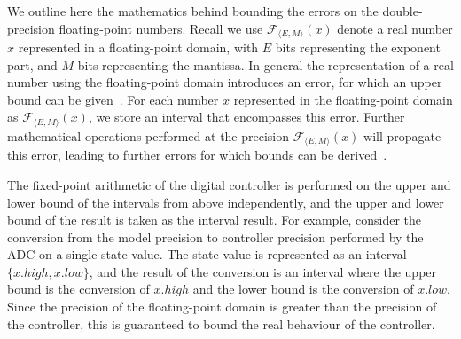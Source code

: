 We outline here the mathematics behind bounding the errors on the double-precision floating-point numbers. 
Recall we use $\mathcal{F}_{\langle E,M \rangle}(x)$ denote a real number $x$ represented in a floating-point domain, 
with $E$ bits representing the exponent part, and $M$ bits representing the mantissa. 
In general the representation of a real number using the floating-point domain introduces an error, 
for which an upper bound can be given~\cite{DBLP:conf/arith/BrainTRW15}.
For each number $x$ represented in the floating-point domain as $\mathcal{F}_{\langle E,M \rangle}(x)$, 
we store an interval that encompasses this error. 
Further mathematical operations performed at the precision $\mathcal{F}_{\langle E,M \rangle}(x)$ will propagate this error, 
leading to further errors for which bounds can be derived~\cite{DBLP:conf/arith/BrainTRW15}.  

The fixed-point arithmetic of the digital controller is performed on the upper and lower bound of the intervals from above independently, 
and the upper and lower bound of the result is taken as the interval result. For example,
consider the conversion from the model precision to controller precision performed by the ADC on a single state value. The state value is represented as an interval $\{x.high, x.low\}$, and the result of the conversion is an interval where the upper bound is the conversion of $x.high$ and the lower bound is the conversion of $x.low$. 
Since the precision of the floating-point domain is greater than the precision of the controller, this is guaranteed to bound the real behaviour of the controller. 



\ifx\axelerator


